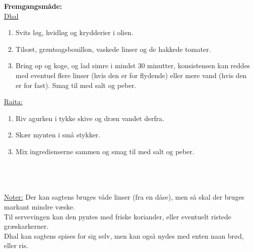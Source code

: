 \documentclass{book}
\begin{document}
\begin{minipage}[t]{0.5\textwidth}
\textbf{Fremgangsmåde:} \\
\underline{Dhal} 
\begin{enumerate}
    \item Svits løg, hvidløg og krydderier i olien.
    \item Tilsæt, grøntsagsbouillon, vaskede linser og de hakkede tomater.
    \item Bring op og koge, og lad simre i mindst 30 minutter, konsistensen kan reddes med eventuel flere linser (hvis den er for flydende) eller mere vand (hvis den er for fast). Smag til med salt og peber.
\end{enumerate}
\underline{Raita:}
\begin{enumerate}
    \item Riv agurken i tykke skive og dræn vandet derfra.
    \item Skær mynten i små stykker.
    \item Mix ingredienserne sammen og smag til med salt og peber.
\end{enumerate}
\end{minipage}
\\ \\ \\ \underline{Noter:}
Der kan sagtens bruges våde linser (fra en dåse), men så skal der bruges markant mindre væske. \\ Til servevingen kan den pyntes med friske koriander, eller eventuelt ristede græskarkerner.  \\ Dhal kan sagtens spises for sig selv, men kan også nydes med enten naan brød, eller ris.
\end{document}
